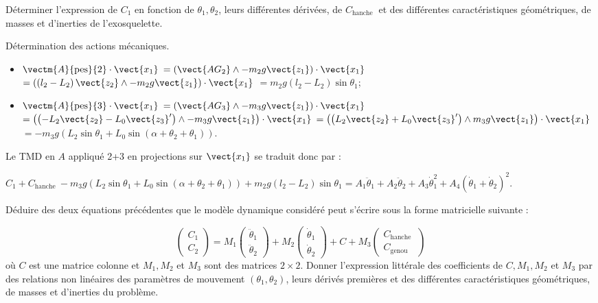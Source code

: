 \documentclass[11pt]{article}
\begin{document}
\UPSTIquestion Déterminer l'expression de $C_{1}$ en fonction de $\theta_{1}, \theta_{2}$, leurs différentes dérivées, de $C_{\textrm {hanche }}$ et des différentes caractéristiques géométriques, de masses et d'inerties de l'exosquelette.

\begin{UPSTIcorrige}
Détermination des actions mécaniques.
\begin{itemize}
\item $\vectm{A}{\text{pes}}{2}\cdot \vect{x_1}$ 
$ =\left(\vect{AG_2}\wedge - m_2 g \vect{z_1} \right)\cdot \vect{x_1}$
$ =\left(\left( l_2 - L_2\right)\vect{z_2}\wedge - m_2 g \vect{z_1} \right)\cdot \vect{x_1}$
$ = m_2 g\left( l_2 - L_2\right) \sin \theta_1$;
\item $\vectm{A}{\text{pes}}{3}\cdot \vect{x_1}$ 
$ =\left(\vect{AG_3}\wedge - m_3 g \vect{z_1} \right)\cdot \vect{x_1}$
$ =\left(\left(  - L_2 \vect{z_2}- L_0 \vect{z_3}'\right)\wedge - m_3 g \vect{z_1} \right)\cdot \vect{x_1}$
$ =\left(\left( L_2 \vect{z_2} + L_0 \vect{z_3}'\right)\wedge m_3 g \vect{z_1} \right)\cdot \vect{x_1}$
$ = - m_3 g\left(  L_2 \sin \theta_1 +  L_0 \sin\left( \alpha + \theta_2 + \theta_1\right)\right) $.
\end{itemize}

Le TMD en $A$ appliqué 2+3 en projections sur $\vect{x_1}$ se traduit donc par :

  $C_{1} + C_{\textrm {hanche }}- m_3 g\left(  L_2 \sin \theta_1 +  L_0 \sin\left( \alpha + \theta_2 + \theta_1\right)\right)  + m_2 g\left( l_2 - L_2\right) \sin \theta_1 = A_{1} \ddot{\theta}_{1}+A_{2} \ddot{\theta}_{2}+A_{3} \dot{\theta}_{1}^{2}+A_{4}\left(\dot{\theta}_{1}+\dot{\theta}_{2}\right)^{2}$.
\end{UPSTIcorrige}

\UPSTIquestion  Déduire des deux équations précédentes que le modèle dynamique considéré peut s'écrire sous la forme matricielle suivante :

$$
\left(\begin{array}{l}
C_{1} \\
C_{2}
\end{array}\right)=M_{1}\left(\begin{array}{c}
\ddot{\theta}_{1} \\
\ddot{\theta}_{2}
\end{array}\right)+M_{2}\left(\begin{array}{c}
\dot{\theta}_{1} \\
\dot{\theta}_{2}
\end{array}\right)+C+M_{3}\left(\begin{array}{c}
C_{\textrm {hanche }} \\
C_{\textrm {genou }}
\end{array}\right)
$$
où $C$ est une matrice colonne et $M_{1}, M_{2}$ et $M_{3}$ sont des matrices $2 \times 2$. Donner l'expression littérale des coefficients de $C, M_{1}, M_{2}$ et $M_{3}$ par des relations non linéaires des paramètres de mouvement $\left(\theta_{1}, \theta_{2}\right)$, leurs dérivés premières et des différentes caractéristiques géométriques, de masses et d'inerties du problème.
\end{document}
